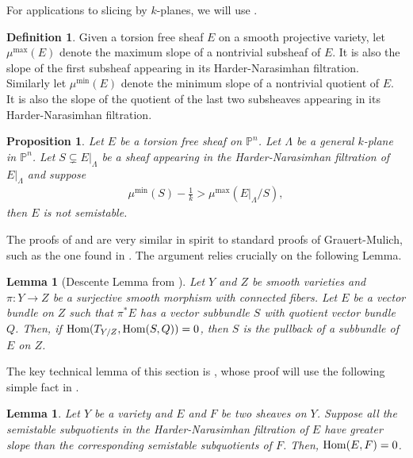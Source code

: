 \documentclass[11pt,reqno]{amsart}
\theoremstyle{plain}
\newtheorem{proposition}[theorem]{Proposition}
\newtheorem{lemma}[theorem]{Lemma}
\theoremstyle{definition}
\newtheorem{definition}[theorem]{Definition}
\theoremstyle{remark}
\numberwithin{equation}{section}
\renewcommand{\to}{{\longrightarrow}}
\numberwithin{equation}{section}
\begin{document}
For applications to slicing by $k$-planes, we will use .
\begin{definition}
Given a torsion free sheaf $E$ on a smooth projective variety, let $\mu^{\max}(E)$ denote the maximum slope of a nontrivial subsheaf of $E$. It is also the slope of the first subsheaf appearing in its Harder-Narasimhan filtration. Similarly let $\mu^{\min}(E)$ denote the minimum slope of a nontrivial quotient of $E$. It is also the slope of the quotient of the last two subsheaves appearing in its Harder-Narasimhan filtration.
\end{definition}

\begin{proposition}
\label{lem:slopesOfRestrictionsTokPlanes}
Let $E$ be a torsion free sheaf on $\mathbb{P}^n$. Let $\Lambda$ be a general $k$-plane in $\mathbb{P}^n$. Let $S\subsetneq E|_{\Lambda}$ be a sheaf appearing in the Harder-Narasimhan filtration of $E|_{\Lambda}$ and suppose
\begin{align*}
\mu^{\min}(S)-\frac{1}{k}>\mu^{\max}(E|_{\Lambda}/S),
\end{align*}
then $E$ is not semistable.
\end{proposition}

The proofs of  and  are very similar in spirit to standard proofs of Grauert-Mulich, such as the one found in \cite{OSS80}. The argument relies crucially on the following Lemma.

\begin{lemma}[{Descente Lemma from \cite[Lemma 2.1.2]{OSS80}}]
\label{lem-descent}
Let $Y$ and $Z$ be smooth varieties and $\pi: Y\to Z$ be a surjective smooth morphism with connected fibers. Let $E$ be a vector bundle on $Z$ such that $\pi^{*}E$ has a vector subbundle $S$ with quotient vector bundle $Q$. Then, if $\operatorname{Hom}(T_{Y/Z},\operatorname{Hom}(S,Q))=0$, then $S$ is the pullback of a subbundle of $E$ on $Z$.
\end{lemma}

The key technical lemma of this section is , whose proof will use the following simple fact in .

\begin{lemma}
\label{subquots}
Let $Y$ be a variety and $E$ and $F$ be two sheaves on $Y$. Suppose all the semistable subquotients in the Harder-Narasimhan filtration of $E$ have greater slope than the corresponding semistable subquotients of $F$. Then, $\operatorname{Hom}(E,F)=0$.
\end{lemma}
\end{document}

